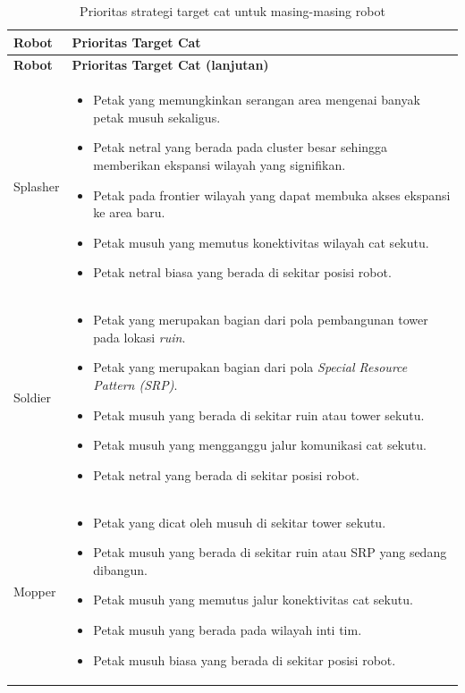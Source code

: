 \documentclass{article}
\begin{document}
\begin{longtable}{|p{3cm}|p{11cm}|}
\caption{Prioritas strategi target cat untuk masing-masing robot} \\

\hline
\textbf{Robot} & \textbf{Prioritas Target Cat} \\
\hline
\endfirsthead

\hline
\textbf{Robot} & \textbf{Prioritas Target Cat (lanjutan)} \\
\hline
\endhead

Splasher &
\begin{itemize}[leftmargin=*, nosep]
\item Petak yang memungkinkan serangan area mengenai banyak petak musuh sekaligus.
\item Petak netral yang berada pada cluster besar sehingga memberikan ekspansi wilayah yang signifikan.
\item Petak pada frontier wilayah yang dapat membuka akses ekspansi ke area baru.
\item Petak musuh yang memutus konektivitas wilayah cat sekutu.
\item Petak netral biasa yang berada di sekitar posisi robot.
\end{itemize}
\\
\hline

Soldier &
\begin{itemize}[leftmargin=*, nosep]
\item Petak yang merupakan bagian dari pola pembangunan tower pada lokasi \textit{ruin}.
\item Petak yang merupakan bagian dari pola \textit{Special Resource Pattern (SRP)}.
\item Petak musuh yang berada di sekitar ruin atau tower sekutu.
\item Petak musuh yang mengganggu jalur komunikasi cat sekutu.
\item Petak netral yang berada di sekitar posisi robot.
\end{itemize}
\\
\hline

Mopper &
\begin{itemize}[leftmargin=*, nosep]
\item Petak yang dicat oleh musuh di sekitar tower sekutu.
\item Petak musuh yang berada di sekitar ruin atau SRP yang sedang dibangun.
\item Petak musuh yang memutus jalur konektivitas cat sekutu.
\item Petak musuh yang berada pada wilayah inti tim.
\item Petak musuh biasa yang berada di sekitar posisi robot.
\end{itemize}
\\
\hline

\end{longtable}
\end{document}
